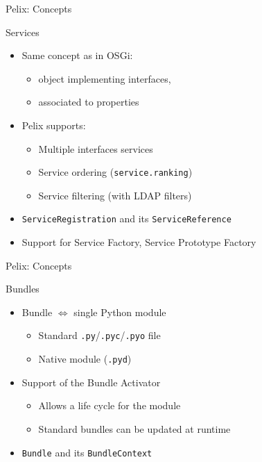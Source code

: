 \begin{frame}{Pelix: Concepts}
\begin{block}{Services}
\begin{itemize}
\item Same concept as in OSGi:
\begin{itemize}
\item object implementing interfaces,
\item associated to properties
\end{itemize}
\item Pelix supports:
\begin{itemize}
\item Multiple interfaces services
\item Service ordering (\texttt{service.ranking})
\item Service filtering (with LDAP filters)
\end{itemize}
\item \texttt{ServiceRegistration} and its \texttt{ServiceReference}
\item Support for Service Factory, Service Prototype Factory
\end{itemize}
\end{block}
\end{frame}

\begin{frame}{Pelix: Concepts}
\begin{block}{Bundles}
\begin{itemize}
\item Bundle $\Leftrightarrow$ single Python module
\begin{itemize}
\item Standard \texttt{.py}/\texttt{.pyc}/\texttt{.pyo} file
\item Native module (\texttt{.pyd})
\end{itemize}
\item Support of the Bundle Activator
\begin{itemize}
\item Allows a life cycle for the module
\item Standard bundles can be updated at runtime
\end{itemize}
\item \texttt{Bundle} and its \texttt{BundleContext}
\end{itemize}
\end{block}
\end{frame}


